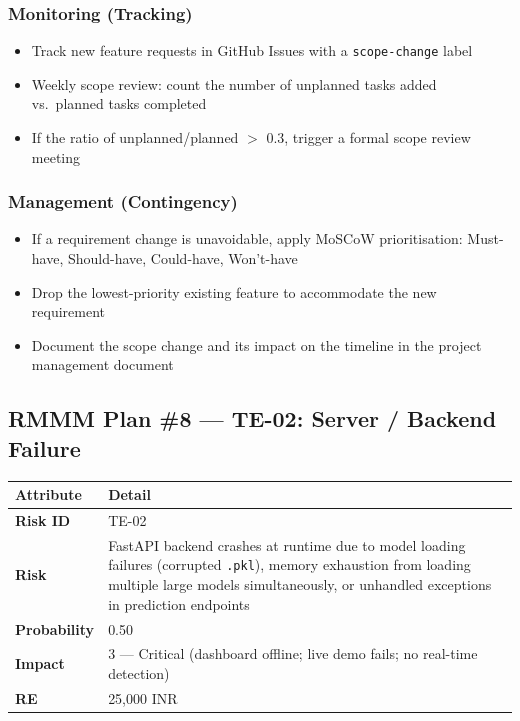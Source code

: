 \documentclass[11pt, a4paper]{article}
\newcommand{\col}[1]{\texttt{\small #1}}
\begin{document}
\subsubsection*{Monitoring (Tracking)}
\begin{itemize}[leftmargin=*]
    \item Track new feature requests in GitHub Issues with a \col{scope-change} label
    \item Weekly scope review: count the number of unplanned tasks added vs.\ planned tasks completed
    \item If the ratio of unplanned/planned $>$ 0.3, trigger a formal scope review meeting
\end{itemize}

\subsubsection*{Management (Contingency)}
\begin{itemize}[leftmargin=*]
    \item If a requirement change is unavoidable, apply MoSCoW prioritisation: Must-have, Should-have, Could-have, Won't-have
    \item Drop the lowest-priority existing feature to accommodate the new requirement
    \item Document the scope change and its impact on the timeline in the project management document
\end{itemize}

\subsection{RMMM Plan \#8 --- TE-02: Server / Backend Failure}

\begin{center}
\small
\begin{tabular}{|l|p{10cm}|}
\hline
\rowcolor{yellow!15}
\textbf{Attribute} & \textbf{Detail} \\
\hline
\textbf{Risk ID} & TE-02 \\
\hline
\textbf{Risk} & FastAPI backend crashes at runtime due to model loading failures (corrupted \col{.pkl}), memory exhaustion from loading multiple large models simultaneously, or unhandled exceptions in prediction endpoints \\
\hline
\textbf{Probability} & 0.50 \\
\hline
\textbf{Impact} & 3 --- Critical (dashboard offline; live demo fails; no real-time detection) \\
\hline
\textbf{RE} & 25,000 INR \\
\hline
\end{tabular}
\normalsize
\end{center}
\end{document}
